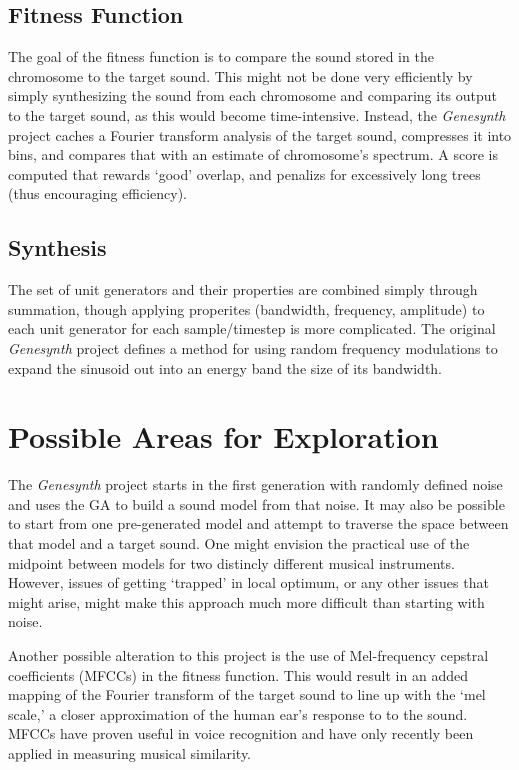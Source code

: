 \documentclass[11pt]{article}
\begin{document}
\subsection{Fitness Function}

The goal of the fitness function is to compare the sound stored in the chromosome to the target sound. This might not be done very efficiently by simply synthesizing the sound from each chromosome and comparing its output to the target sound, as this would become time-intensive. Instead, the \emph{Genesynth} project caches a Fourier transform analysis of the target sound, compresses it into bins, and compares that with an estimate of chromosome's spectrum. A score is computed that rewards `good' overlap, and penalizs for excessively long trees (thus encouraging efficiency).

\subsection{Synthesis}

The set of unit generators and their properties are combined simply through summation, though applying properites (bandwidth, frequency, amplitude) to each unit generator for each sample/timestep is more complicated. The original \emph{Genesynth} project defines a method for using random frequency modulations to expand the sinusoid out into an energy band the size of its bandwidth.

\section{Possible Areas for Exploration}

The \emph{Genesynth} project starts in the first generation with randomly defined noise and uses the GA to build a sound model from that noise. It may also be possible to start from one pre-generated model and attempt to traverse the space between that model and a target sound. One might envision the practical use of the midpoint between models for two distincly different musical instruments. However, issues of getting `trapped' in local optimum, or any other issues that might arise, might make this approach much more difficult than starting with noise.

Another possible alteration to this project is the use of Mel-frequency cepstral coefficients (MFCCs) in the fitness function. This would result in an added mapping of the Fourier transform of the target sound to line up with the `mel scale,' a closer approximation of the human ear's response to to the sound. MFCCs have proven useful in voice recognition and have only recently been applied in measuring musical similarity.\cite{synthbot}
\end{document}
